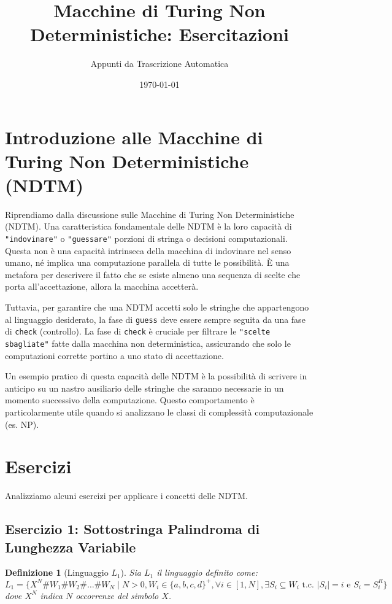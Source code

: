 \documentclass[a4paper]{article}
\title{Macchine di Turing Non Deterministiche: Esercitazioni}
\author{Appunti da Trascrizione Automatica}
\date{\today}
\newtheorem{definition}{Definizione}
\begin{document}
\maketitle
\tableofcontents
\newpage

\section{Introduzione alle Macchine di Turing Non Deterministiche (NDTM)}

Riprendiamo dalla discussione sulle Macchine di Turing Non Deterministiche (NDTM).
Una caratteristica fondamentale delle NDTM è la loro capacità di \texttt{"indovinare"} o \texttt{"guessare"} porzioni di stringa o decisioni computazionali. Questa non è una capacità intrinseca della macchina di indovinare nel senso umano, né implica una computazione parallela di tutte le possibilità. È una metafora per descrivere il fatto che se esiste almeno una sequenza di scelte che porta all'accettazione, allora la macchina accetterà.

Tuttavia, per garantire che una NDTM accetti solo le stringhe che appartengono al linguaggio desiderato, la fase di \texttt{guess} deve essere sempre seguita da una fase di \texttt{check} (controllo). La fase di \texttt{check} è cruciale per filtrare le \texttt{"scelte sbagliate"} fatte dalla macchina non deterministica, assicurando che solo le computazioni corrette portino a uno stato di accettazione.

Un esempio pratico di questa capacità delle NDTM è la possibilità di scrivere in anticipo su un nastro ausiliario delle stringhe che saranno necessarie in un momento successivo della computazione. Questo comportamento è particolarmente utile quando si analizzano le classi di complessità computazionale (es. NP).

\section{Esercizi}

Analizziamo alcuni esercizi per applicare i concetti delle NDTM.

\subsection{Esercizio 1: Sottostringa Palindroma di Lunghezza Variabile}

\begin{definition}[Linguaggio $L_1$]
Sia $L_1$ il linguaggio definito come:
$L_1 = \{ X^N \# W_1 \# W_2 \# \dots \# W_N \mid N > 0, W_i \in \{a,b,c,d\}^+, \forall i \in [1, N], \exists S_i \subseteq W_i \text{ t.c. } |S_i| = i \text{ e } S_i = S_i^R \}$
dove $X^N$ indica $N$ occorrenze del simbolo $X$.
\end{definition}
\end{document}

